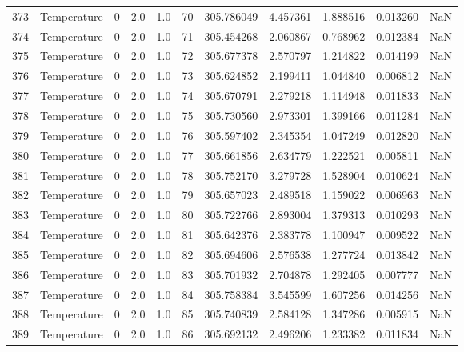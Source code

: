 \begin{tabular}{llrrrrrrrrr}
373 &  Temperature &       0 &  2.0 &  1.0 &   70 &  305.786049 &  4.457361 &  1.888516 &   0.013260 &      NaN \\
374 &  Temperature &       0 &  2.0 &  1.0 &   71 &  305.454268 &  2.060867 &  0.768962 &   0.012384 &      NaN \\
375 &  Temperature &       0 &  2.0 &  1.0 &   72 &  305.677378 &  2.570797 &  1.214822 &   0.014199 &      NaN \\
376 &  Temperature &       0 &  2.0 &  1.0 &   73 &  305.624852 &  2.199411 &  1.044840 &   0.006812 &      NaN \\
377 &  Temperature &       0 &  2.0 &  1.0 &   74 &  305.670791 &  2.279218 &  1.114948 &   0.011833 &      NaN \\
378 &  Temperature &       0 &  2.0 &  1.0 &   75 &  305.730560 &  2.973301 &  1.399166 &   0.011284 &      NaN \\
379 &  Temperature &       0 &  2.0 &  1.0 &   76 &  305.597402 &  2.345354 &  1.047249 &   0.012820 &      NaN \\
380 &  Temperature &       0 &  2.0 &  1.0 &   77 &  305.661856 &  2.634779 &  1.222521 &   0.005811 &      NaN \\
381 &  Temperature &       0 &  2.0 &  1.0 &   78 &  305.752170 &  3.279728 &  1.528904 &   0.010624 &      NaN \\
382 &  Temperature &       0 &  2.0 &  1.0 &   79 &  305.657023 &  2.489518 &  1.159022 &   0.006963 &      NaN \\
383 &  Temperature &       0 &  2.0 &  1.0 &   80 &  305.722766 &  2.893004 &  1.379313 &   0.010293 &      NaN \\
384 &  Temperature &       0 &  2.0 &  1.0 &   81 &  305.642376 &  2.383778 &  1.100947 &   0.009522 &      NaN \\
385 &  Temperature &       0 &  2.0 &  1.0 &   82 &  305.694606 &  2.576538 &  1.277724 &   0.013842 &      NaN \\
386 &  Temperature &       0 &  2.0 &  1.0 &   83 &  305.701932 &  2.704878 &  1.292405 &   0.007777 &      NaN \\
387 &  Temperature &       0 &  2.0 &  1.0 &   84 &  305.758384 &  3.545599 &  1.607256 &   0.014256 &      NaN \\
388 &  Temperature &       0 &  2.0 &  1.0 &   85 &  305.740839 &  2.584128 &  1.347286 &   0.005915 &      NaN \\
389 &  Temperature &       0 &  2.0 &  1.0 &   86 &  305.692132 &  2.496206 &  1.233382 &   0.011834 &      NaN \\

\end{tabular}

